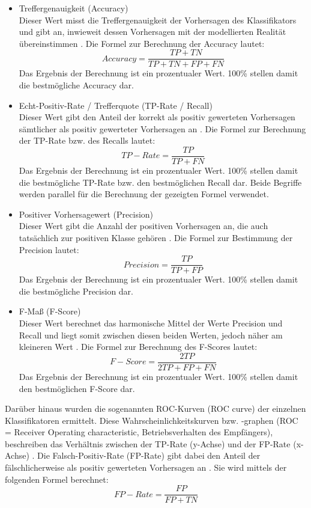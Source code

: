 \begin{itemize}
\item Treffergenauigkeit (Accuracy)
\\Dieser Wert misst die Treffergenauigkeit der Vorhersagen des Klassifikators und gibt an, inwieweit dessen Vorhersagen mit der modellierten Realität übereinstimmen \cite{Sammut2017}. Die Formel zur Berechnung der Accuracy lautet:
\\\[Accuracy = \frac{TP+TN}{TP+TN+FP+FN}\]
Das Ergebnis der Berechnung ist ein prozentualer Wert. 100\% stellen damit die bestmögliche Accuracy dar.
\item Echt-Positiv-Rate / Trefferquote (TP-Rate / Recall)
\\Dieser Wert gibt den Anteil der korrekt als positiv gewerteten Vorhersagen sämtlicher als positiv gewerteter Vorhersagen an \cite{Alpaydin2010}. Die Formel zur Berechnung der TP-Rate bzw. des Recalls lautet:
\\\[TP-Rate = \frac{TP}{TP+FN}\]
Das Ergebnis der Berechnung ist ein prozentualer Wert. 100\% stellen damit die bestmögliche TP-Rate bzw. den bestmöglichen Recall dar. Beide Begriffe werden parallel für die Berechnung der gezeigten Formel verwendet.
\item Positiver Vorhersagewert (Precision)
\\ Dieser Wert gibt die Anzahl der positiven Vorhersagen an, die auch tatsächlich zur positiven Klasse gehören \cite{Sammut2017}. Die Formel zur Bestimmung der Precision lautet:
\\\[Precision = \frac{TP}{TP+FP}\]
Das Ergebnis der Berechnung ist ein prozentualer Wert. 100\% stellen damit die bestmögliche Precision dar.
\item F-Maß (F-Score)
\\ Dieser Wert berechnet das harmonische Mittel der Werte Precision und Recall und liegt somit zwischen diesen beiden Werten, jedoch näher am kleineren Wert \cite{Sammut2017}. Die Formel zur Berechnung des F-Scores lautet:
\\\[F-Score = \frac{2TP}{2TP+FP+FN}\]
Das Ergebnis der Berechnung ist ein prozentualer Wert. 100\% stellen damit den bestmöglichen F-Score dar.
\end{itemize}

Darüber hinaus wurden die sogenannten ROC-Kurven (ROC curve) der einzelnen Klassifikatoren ermittelt. Diese Wahrscheinlichkeitskurven bzw. -graphen (ROC = Receiver Operating characteristic, Betriebsverhalten des Empfängers), beschreiben das Verhältnis zwischen der TP-Rate (y-Achse) und der FP-Rate (x-Achse) \cite{Sammut2017,Narkhede2018}. Die Falsch-Positiv-Rate (FP-Rate) gibt dabei den Anteil der fälschlicherweise als positiv gewerteten Vorhersagen an \cite{Alpaydin2010}. Sie wird mittels der folgenden Formel berechnet:
\\\[FP-Rate = \frac{FP}{FP+TN}\]

